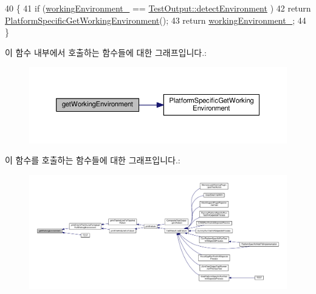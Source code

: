 \begin{DoxyCode}
40 \{
41     \textcolor{keywordflow}{if} (\hyperlink{class_test_output_a8b622cfce4b95599cd31b61a777d68ef}{workingEnvironment\_} == \hyperlink{class_test_output_a0541851f863713454486a9fb3080f766a3f11f791db94db142e33c3c75442ed10}{TestOutput::detectEnvironment}
      )
42         \textcolor{keywordflow}{return} \hyperlink{_platform_specific_functions_8h_a158e08df89f2edf2f29333d6026979b1}{PlatformSpecificGetWorkingEnvironment}();
43     \textcolor{keywordflow}{return} \hyperlink{class_test_output_a8b622cfce4b95599cd31b61a777d68ef}{workingEnvironment\_};
44 \}
\end{DoxyCode}


이 함수 내부에서 호출하는 함수들에 대한 그래프입니다.\+:
\nopagebreak
\begin{figure}[H]
\begin{center}
\leavevmode
\includegraphics[width=350pt]{class_test_output_a90d5028d0f7f6f41ca2dced042a8709d_cgraph}
\end{center}
\end{figure}




이 함수를 호출하는 함수들에 대한 그래프입니다.\+:
\nopagebreak
\begin{figure}[H]
\begin{center}
\leavevmode
\includegraphics[width=350pt]{class_test_output_a90d5028d0f7f6f41ca2dced042a8709d_icgraph}
\end{center}
\end{figure}



